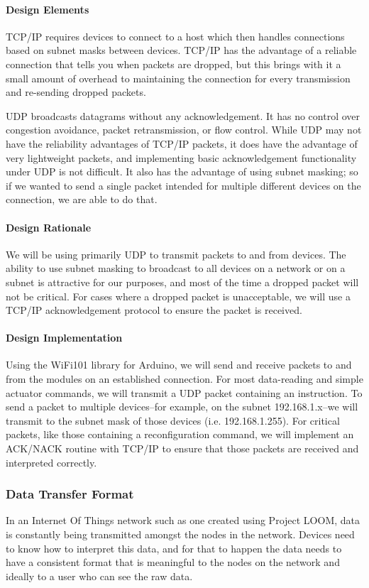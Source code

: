 \documentclass[onecolumn, draftclsnofoot,10pt, compsoc]{IEEEtran}
\begin{document}
\paragraph{Design Elements}
    TCP/IP \cite{TCP} requires devices to connect to a host which then handles connections based on subnet masks between devices. TCP/IP has the advantage of a reliable connection that tells you when packets are dropped, but this brings with it a small amount of overhead to maintaining the connection for every transmission and re-sending dropped packets.

    UDP \cite{UDP} broadcasts datagrams without any acknowledgement. It has no control over congestion avoidance, packet retransmission, or flow control. While UDP may not have the reliability advantages of TCP/IP packets, it does have the advantage of very lightweight packets, and implementing basic acknowledgement functionality under UDP is not difficult. It also has the advantage of using subnet masking; so if we wanted to send a single packet intended for multiple different devices on the connection, we are able to do that.

\paragraph{Design Rationale}
    We will be using primarily UDP to transmit packets to and from devices. The ability to use subnet masking to broadcast to all devices on a network or on a subnet is attractive for our purposes, and most of the time a dropped packet will not be critical. For cases where a dropped packet is unacceptable, we will use a TCP/IP acknowledgement protocol to ensure the packet is received.

\paragraph{Design Implementation}
    Using the WiFi101 library for Arduino, we will send and receive packets to and from the modules on an established connection. For most data-reading and simple actuator commands, we will transmit a UDP packet containing an instruction. To send a packet to multiple devices--for example, on the subnet 192.168.1.x--we will transmit to the subnet mask of those devices (i.e. 192.168.1.255). For critical packets, like those containing a reconfiguration command, we will implement an ACK/NACK routine with TCP/IP to ensure that those packets are received and interpreted correctly.


\subsubsection{Data Transfer Format}
    In an Internet Of Things network such as one created using Project LOOM, data is constantly being transmitted amongst the nodes in the network. Devices need to know how to interpret this data, and for that to happen the data needs to have a consistent format that is meaningful to the nodes on the network and ideally to a user who can see the raw data.
\end{document}
